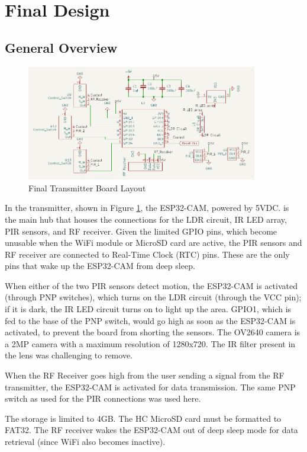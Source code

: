 \documentclass[class=report,11pt,crop=false]{standalone}
\begin{document}
\section{Final Design}

\subsection{General Overview}
\begin{figure}[h]
\centering
\includegraphics[width=0.9\textwidth]{Images/Transmitter_layout.png}
\caption{Final Transmitter Board Layout}
\label{fig:T_Schem}
\end{figure}

In the transmitter, shown in Figure \ref{fig:T_Schem}, the ESP32-CAM, powered by 5VDC. is the main hub that houses the connections for the LDR circuit, IR LED array, PIR sensors, and RF receiver. 
Given the limited GPIO pins, which become unusable when the WiFi module or MicroSD card are active, the PIR sensors and RF receiver are connected to Real-Time Clock (RTC) pins. These are the only pins that wake up the ESP32-CAM from deep sleep. 

When either of the two PIR sensors detect motion, the ESP32-CAM is activated (through PNP switches), which turns on the LDR circuit (through the VCC pin); if it is dark, the IR LED circuit turns on to light up the area. GPIO1, which is fed to the base of the PNP switch, would go high as soon as the ESP32-CAM is activated, to prevent the board from shorting the sensors. The OV2640 camera is a 2MP camera with a maximum resolution of 1280x720. The IR filter present in the lens was challenging to remove. 

When the RF Receiver goes high from the user sending a signal from the RF transmitter, the ESP32-CAM is activated for data transmission. The same PNP switch as used for the PIR connections was used here. 

The storage is limited to 4GB. The HC MicroSD card must be formatted to FAT32. The RF receiver wakes the ESP32-CAM out of deep sleep mode for data retrieval (since WiFi also becomes inactive). 
\end{document}
